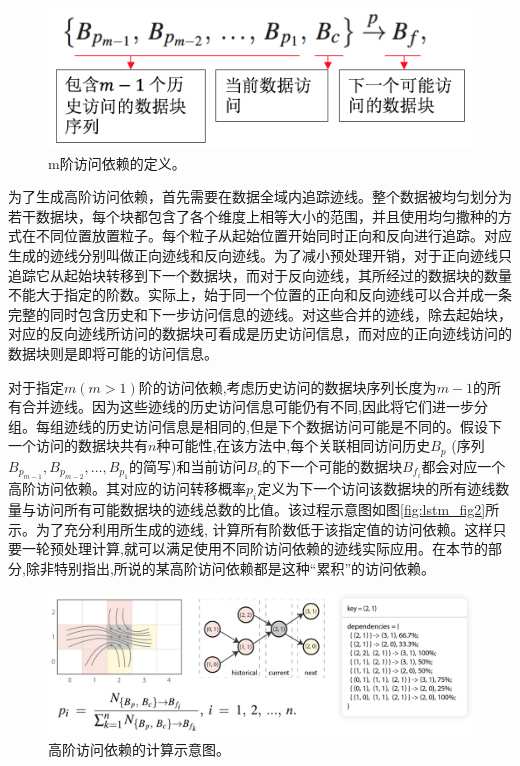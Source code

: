 \begin{figure}[!tb]
  \centering
  \includegraphics[width=.6\linewidth]{image/prefetch/highorder_fig2.png}
  \caption{
    m阶访问依赖的定义。\parencite{ZhangGY16}
  }
  \label{fig:highorder_fig2}
\end{figure}

为了生成高阶访问依赖，首先需要在数据全域内追踪迹线。整个数据被均匀划分为若干数据块，每个块都包含了各个维度上相等大小的范围，并且使用均匀撒种的方式在不同位置放置粒子。每个粒子从起始位置开始同时正向和反向进行追踪。对应生成的迹线分别叫做正向迹线和反向迹线。为了减小预处理开销，对于正向迹线只追踪它从起始块转移到下一个数据块，而对于反向迹线，其所经过的数据块的数量不能大于指定的阶数。实际上，始于同一个位置的正向和反向迹线可以合并成一条完整的同时包含历史和下一步访问信息的迹线。对这些合并的迹线，除去起始块，对应的反向迹线所访问的数据块可看成是历史访问信息，而对应的正向迹线访问的数据块则是即将可能的访问信息。

对于指定$m (m > 1)$阶的访问依赖,考虑历史访问的数据块序列长度为$m - 1$的所有合并迹线。因为这些迹线的历史访问信息可能仍有不同,因此将它们进一步分组。每组迹线的历史访问信息是相同的,但是下个数据访问可能是不同的。假设下一个访问的数据块共有$n$种可能性,在该方法中,每个关联相同访问历史$B_p$ (序列$B_{p_{m − 1}}, B_{p_{m − 2}}, …, B_{p_1}$的简写)和当前访问$B_c$的下一个可能的数据块$B_{f_i}$都会对应一个高阶访问依赖。其对应的访问转移概率$p_i$定义为下一个访问该数据块的所有迹线数量与访问所有可能数据块的迹线总数的比值。该过程示意图如图\ref{fig:lstm_fig2}所示。为了充分利用所生成的迹线, 计算所有阶数低于该指定值的访问依赖。这样只要一轮预处理计算,就可以满足使用不同阶访问依赖的迹线实际应用。在本节的部分,除非特别指出,所说的某高阶访问依赖都是这种“累积”的访问依赖。

\begin{figure}[!tb]
  \centering
  \includegraphics[width=\linewidth]{image/prefetch/highorder_fig3.png}
  \caption{
    高阶访问依赖的计算示意图。\parencite{ZhangGY16}
  }
  \label{fig:highorder_fig3}
\end{figure}


